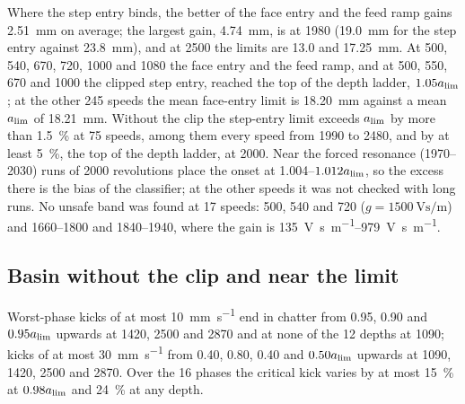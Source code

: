Where the step entry binds, the better of the face entry and the feed ramp gains \SI{2.51}{\milli\metre} on average; the largest gain, \SI{4.74}{\milli\metre}, is at \SI{1980}{\rpm} (\SI{19.0}{\milli\metre} for the step entry against \SI{23.8}{\milli\metre}), and at \SI{2500}{\rpm} the limits are 13.0 and \SI{17.25}{\milli\metre}. At 500, 540, 670, 720, 1000 and \SI{1080}{\rpm} the face entry and the feed ramp, and at 500, 550, 670 and \SI{1000}{\rpm} the clipped step entry, reached the top of the depth ladder, $1.05a_{\lim}$; at the other 245 speeds the mean face-entry limit is \SI{18.20}{\milli\metre} against a mean $a_{\lim}$ of \SI{18.21}{\milli\metre}. Without the clip the step-entry limit exceeds $a_{\lim}$ by more than \SI{1.5}{\percent} at 75 speeds, among them every speed from 1990 to \SI{2480}{\rpm}, and by at least \SI{5}{\percent}, the top of the depth ladder, at \SI{2000}{\rpm}. Near the forced resonance (\SIrange{1970}{2030}{\rpm}) runs of 2000 revolutions place the onset at 1.004--$1.012a_{\lim}$, so the excess there is the bias of the classifier; at the other speeds it was not checked with long runs. No unsafe band was found at 17 speeds: 500, 540 and \SI{720}{\rpm} ($g=\SI{1500}{\volt\second\per\metre}$) and 1660--1800 and \SIrange{1840}{1940}{\rpm}, where the gain is \SIrange{135}{979}{\volt\second\per\metre}.

\subsection{Basin without the clip and near the limit}\label{supp:bistab-basin}

Worst-phase kicks of at most \SI{10}{\milli\metre\per\second} end in chatter from 0.95, 0.90 and $0.95a_{\lim}$ upwards at 1420, 2500 and \SI{2870}{\rpm} and at none of the 12 depths at \SI{1090}{\rpm}; kicks of at most \SI{30}{\milli\metre\per\second} from 0.40, 0.80, 0.40 and $0.50a_{\lim}$ upwards at 1090, 1420, 2500 and \SI{2870}{\rpm}. Over the 16 phases the critical kick varies by at most \SI{15}{\percent} at $0.98a_{\lim}$ and \SI{24}{\percent} at any depth.

